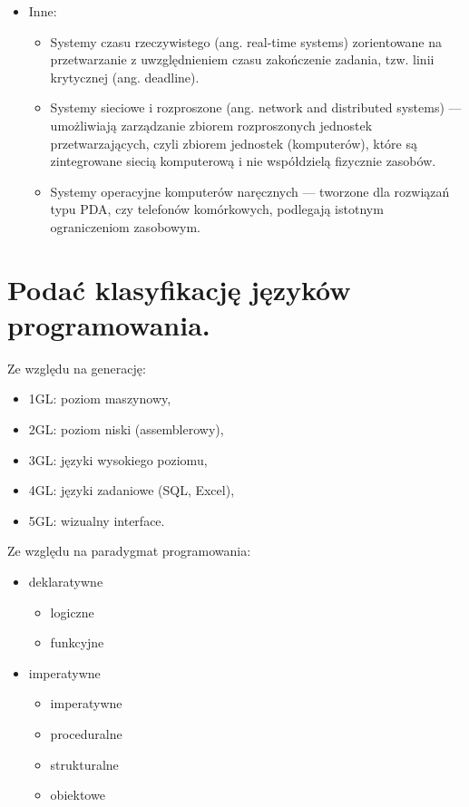 \documentclass[12pt,a4paper]{article}
\begin{document}
\begin{itemize}
		\item Inne:
		\begin{itemize}
			\item Systemy czasu rzeczywistego (ang. real-time systems) zorientowane na przetwarzanie z uwzględnieniem czasu zakończenie zadania, tzw. linii krytycznej (ang. deadline).
			\item Systemy sieciowe i rozproszone (ang. network and distributed systems) — umożliwiają zarządzanie zbiorem rozproszonych jednostek przetwarzających, czyli zbiorem jednostek (komputerów), które są zintegrowane siecią komputerową i nie współdzielą fizycznie zasobów.
			\item Systemy operacyjne komputerów naręcznych — tworzone dla rozwiązań typu PDA, czy telefonów komórkowych, podlegają istotnym ograniczeniom zasobowym.
		\end{itemize}
	\end{itemize}

	\section{Podać klasyfikację języków programowania.}
	Ze względu na generację:	
	\begin{itemize}
		\item 1GL: poziom maszynowy,
		\item 2GL: poziom niski (assemblerowy),
		\item 3GL: języki wysokiego poziomu,
		\item 4GL: języki zadaniowe (SQL, Excel), 
		\item 5GL: wizualny interface.
	\end{itemize}

	Ze względu na paradygmat programowania:	
	\begin{itemize}
		\item deklaratywne
		\begin{itemize}
			\item logiczne
			\item funkcyjne
		\end{itemize}
		\item imperatywne
		\begin{itemize}
			\item imperatywne
			\item proceduralne
			\item strukturalne
			\item obiektowe
		\end{itemize}
	\end{itemize}
	
\end{document}
